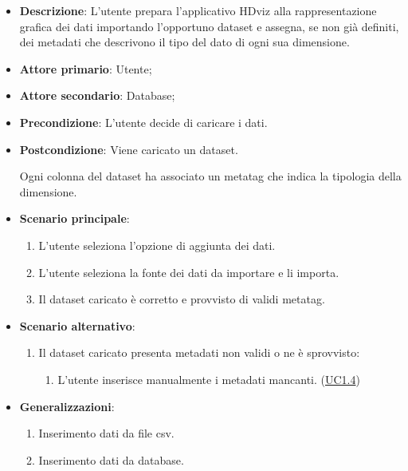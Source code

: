 \begin{itemize}
    \item \textbf{Descrizione}: L'utente prepara l'applicativo HDviz alla rappresentazione
                                grafica dei dati importando l'opportuno dataset e assegna, 
                                se non già definiti, dei metadati 
                                che descrivono il tipo del dato di ogni sua dimensione.
	
    \item \textbf{Attore primario}: Utente;
    \item \textbf{Attore secondario}: Database;
    
    
    \item \textbf{Precondizione}:   L'utente decide di caricare i dati.

    \item \textbf{Postcondizione}:  Viene caricato un dataset. 
    
                                    Ogni colonna del dataset ha associato
                                    un metatag che indica la tipologia della dimensione.

	\item \textbf{Scenario principale}:
		\begin{enumerate}
			\item L'utente seleziona l'opzione di aggiunta dei dati.
            \item L'utente seleziona la fonte dei dati da importare e li importa.
            \item Il dataset caricato è corretto e provvisto di validi metatag.
        \end{enumerate}
   
    \item \textbf{Scenario alternativo}:
		\begin{enumerate}
            \item Il dataset caricato presenta metadati non validi o ne è sprovvisto:
            \begin{enumerate}
                \item L'utente inserisce manualmente i metadati mancanti. (\hyperref[subsec:UC1.4]{UC1.4})
            \end{enumerate}
        \end{enumerate}

    \item \textbf{Generalizzazioni}:
    \begin{enumerate}
        \item Inserimento dati da file csv.
        \item Inserimento dati da database.
    \end{enumerate}
\end{itemize}

